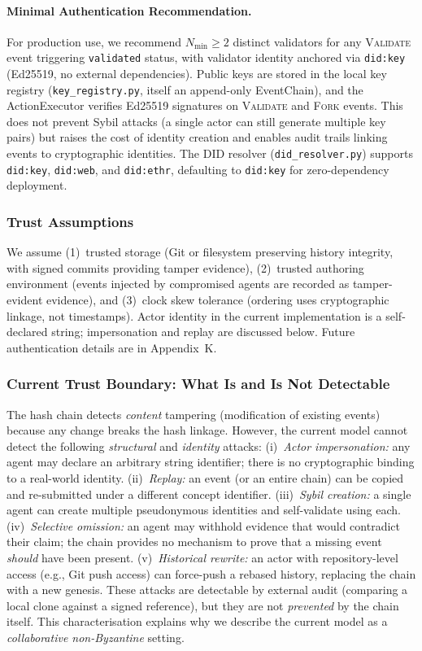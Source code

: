 \paragraph{Minimal Authentication Recommendation.} For production use, we recommend $N_{\min} \geq 2$ distinct validators for any \textsc{Validate} event triggering \texttt{validated} status, with validator identity anchored via \texttt{did:key} (Ed25519, no external dependencies). Public keys are stored in the local key registry (\texttt{key\_registry.py}, itself an append-only EventChain), and the ActionExecutor verifies Ed25519 signatures on \textsc{Validate} and \textsc{Fork} events. This does not prevent Sybil attacks (a single actor can still generate multiple key pairs) but raises the cost of identity creation and enables audit trails linking events to cryptographic identities. The DID resolver (\texttt{did\_resolver.py}) supports \texttt{did:key}, \texttt{did:web}, and \texttt{did:ethr}, defaulting to \texttt{did:key} for zero-dependency deployment.

\subsubsection{Trust Assumptions}

We assume (1)~trusted storage (Git or filesystem preserving history integrity, with signed commits providing tamper evidence), (2)~trusted authoring environment (events injected by compromised agents are recorded as tamper-evident evidence), and (3)~clock skew tolerance (ordering uses cryptographic linkage, not timestamps). Actor identity in the current implementation is a self-declared string; impersonation and replay are discussed below. Future authentication details are in Appendix~K.

\subsubsection{Current Trust Boundary: What Is and Is Not Detectable}

The hash chain detects \emph{content} tampering (modification of existing events) because any change breaks the hash linkage. However, the current model cannot detect the following \emph{structural} and \emph{identity} attacks: (i)~\emph{Actor impersonation:} any agent may declare an arbitrary string identifier; there is no cryptographic binding to a real-world identity. (ii)~\emph{Replay:} an event (or an entire chain) can be copied and re-submitted under a different concept identifier. (iii)~\emph{Sybil creation:} a single agent can create multiple pseudonymous identities and self-validate using each. (iv)~\emph{Selective omission:} an agent may withhold evidence that would contradict their claim; the chain provides no mechanism to prove that a missing event \emph{should} have been present. (v)~\emph{Historical rewrite:} an actor with repository-level access (e.g., Git push access) can force-push a rebased history, replacing the chain with a new genesis. These attacks are detectable by external audit (comparing a local clone against a signed reference), but they are not \emph{prevented} by the chain itself. This characterisation explains why we describe the current model as a \emph{collaborative non-Byzantine} setting.

